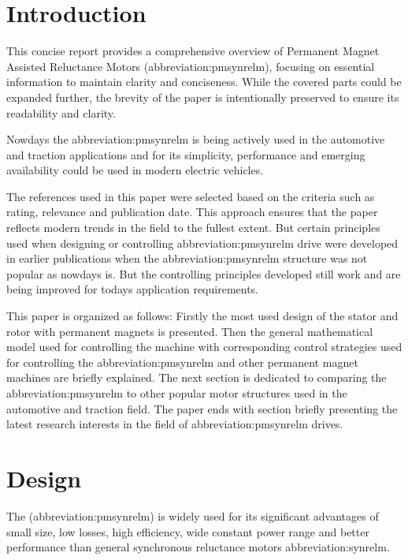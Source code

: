 \documentclass[a4paper, twoside, 11pt]{article}
\begin{document}
\section{Introduction}
This concise report provides a comprehensive overview of Permanent Magnet Assisted Reluctance Motors (\gls{abbreviation:pmsynrelm}),  focusing on essential information to maintain clarity and conciseness. While the covered parts could be expanded further, the brevity of the paper is intentionally preserved to ensure its readability and clarity.\par
Nowdays the \gls{abbreviation:pmsynrelm} is being actively used in the automotive and traction applications and for its simplicity, performance and emerging availability could be used in modern electric vehicles. \par
The references used in this paper were selected based on the criteria such as rating, relevance and publication date. This approach ensures that the paper reflects modern trends in the field to the fullest extent. But certain principles used when designing or controlling \gls{abbreviation:pmsynrelm} drive were developed in earlier publications when the \gls{abbreviation:pmsynrelm} structure was not popular as nowdays is. But the controlling principles developed still work and are being improved for todays application requirements.\par
This paper is organized as follows: Firstly the most used design of the stator and rotor with permanent magnets is presented. Then the general mathematical model used for controlling the machine with corresponding control strategies used for controlling the \gls{abbreviation:pmsynrelm} and other permanent magnet machines are briefly explained. The next section is dedicated to comparing the \gls{abbreviation:pmsynrelm} to other popular motor structures used in the automotive and traction field. The paper ends with section briefly presenting the latest research interests in the field of \gls{abbreviation:pmsynrelm} drives.

\section{Design}
The (\gls{abbreviation:pmsynrelm}) is widely used for its significant advantages of small size, low losses, high efficiency, wide constant power range and better performance than general synchronous reluctance motors \gls{abbreviation:synrelm}. \cite{xinmin-design-of-permanent-magnet-assisted-synch-rel-m-with-low-torque-ripple,huynh-design-and-analysis-of-perm-as-synch-rel-m}
\end{document}
